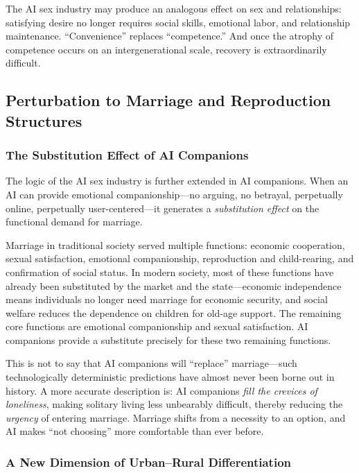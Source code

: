﻿\documentclass[12pt,a4paper]{article}
\begin{document}
The AI sex industry may produce an analogous effect on sex and relationships: satisfying desire no longer requires social skills, emotional labor, and relationship maintenance. ``Convenience'' replaces ``competence.'' And once the atrophy of competence occurs on an intergenerational scale, recovery is extraordinarily difficult.

\subsection{Perturbation to Marriage and Reproduction Structures}

\subsubsection{The Substitution Effect of AI Companions}

The logic of the AI sex industry is further extended in AI companions. When an AI can provide emotional companionship---no arguing, no betrayal, perpetually online, perpetually user-centered---it generates a \emph{substitution effect} on the functional demand for marriage.

Marriage in traditional society served multiple functions: economic cooperation, sexual satisfaction, emotional companionship, reproduction and child-rearing, and confirmation of social status. In modern society, most of these functions have already been substituted by the market and the state---economic independence means individuals no longer need marriage for economic security, and social welfare reduces the dependence on children for old-age support. The remaining core functions are emotional companionship and sexual satisfaction. AI companions provide a substitute precisely for these two remaining functions.

This is not to say that AI companions will ``replace'' marriage---such technologically deterministic predictions have almost never been borne out in history. A more accurate description is: AI companions \emph{fill the crevices of loneliness}, making solitary living less unbearably difficult, thereby reducing the \emph{urgency} of entering marriage. Marriage shifts from a necessity to an option, and AI makes ``not choosing'' more comfortable than ever before.

\subsubsection{A New Dimension of Urban--Rural Differentiation}
\end{document}
